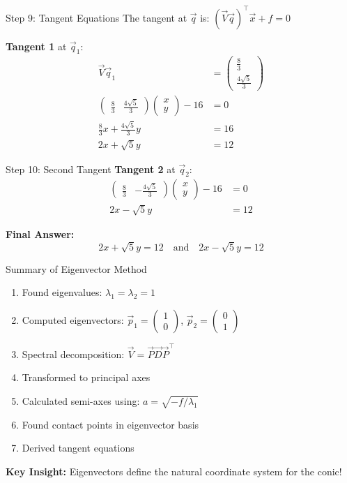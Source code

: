 \documentclass{beamer}
\newcommand{\myvec}[1]{\ensuremath{\begin{pmatrix}#1\end{pmatrix}}}
\begin{document}
	\begin{frame}{Step 9: Tangent Equations}
		The tangent at $\vec{q}$ is: $(\vec{V}\vec{q})^\top \vec{x} + f = 0$
		
		\vspace{1em}
		\textbf{Tangent 1} at $\vec{q}_1$:
		\begin{align}
			\vec{V}\vec{q}_1 &= \myvec{\frac{8}{3}\\\frac{4\sqrt{5}}{3}}\\
			\myvec{\frac{8}{3} & \frac{4\sqrt{5}}{3}}\myvec{x\\y} - 16 &= 0\\
			\frac{8}{3}x + \frac{4\sqrt{5}}{3}y &= 16\\
			2x + \sqrt{5}y &= 12
		\end{align}
	\end{frame}
	
	\begin{frame}{Step 10: Second Tangent}
		\textbf{Tangent 2} at $\vec{q}_2$:
		\begin{align}
			\myvec{\frac{8}{3} & -\frac{4\sqrt{5}}{3}}\myvec{x\\y} - 16 &= 0\\
			2x - \sqrt{5}y &= 12
		\end{align}
		
		\vspace{1em}
		\textbf{Final Answer:}
		\begin{equation}
			\boxed{2x + \sqrt{5}y = 12 \quad \text{and} \quad 2x - \sqrt{5}y = 12}
		\end{equation}
	\end{frame}
	
	\begin{frame}{Summary of Eigenvector Method}
		\begin{enumerate}
			\item Found eigenvalues: $\lambda_1 = \lambda_2 = 1$
			\item Computed eigenvectors: $\vec{p}_1 = \myvec{1\\0}$, $\vec{p}_2 = \myvec{0\\1}$
			\item Spectral decomposition: $\vec{V} = \vec{P}\vec{D}\vec{P}^\top$
			\item Transformed to principal axes
			\item Calculated semi-axes using: $a = \sqrt{-f/\lambda_1}$
			\item Found contact points in eigenvector basis
			\item Derived tangent equations
		\end{enumerate}
		
		\vspace{0.5em}
		\textbf{Key Insight:} Eigenvectors define the natural coordinate system for the conic!
	\end{frame}
	
\end{document}
